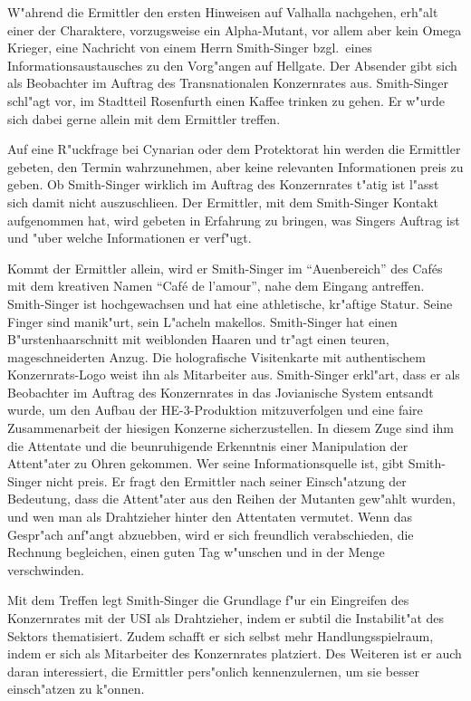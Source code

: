 
W"ahrend die Ermittler den ersten Hinweisen auf Valhalla nachgehen, erh"alt einer der Charaktere, vorzugsweise ein Alpha-Mutant, vor allem aber kein Omega Krieger, eine Nachricht von einem Herrn Smith-Singer bzgl.~eines Informationsaustausches zu den Vorg"angen auf Hellgate. Der Absender gibt sich als Beobachter im Auftrag des Transnationalen Konzernrates aus. Smith-Singer schl"agt vor, im Stadtteil Rosenfurth einen Kaffee trinken zu gehen. Er w"urde sich dabei gerne allein mit dem Ermittler treffen. 

Auf eine R"uckfrage bei Cynarian oder dem Protektorat hin werden die Ermittler gebeten, den Termin wahrzunehmen, aber keine relevanten Informationen preis zu geben. Ob Smith-Singer wirklich im Auftrag des Konzernrates t"atig ist l"asst sich damit nicht auszuschlie\3en. Der Ermittler, mit dem Smith-Singer Kontakt aufgenommen hat, wird gebeten in Erfahrung zu bringen, was Singers Auftrag ist und "uber welche Informationen er verf"ugt. 

Kommt der Ermittler allein, wird er Smith-Singer im "`Au\3enbereich"' des Caf\'es mit dem kreativen Namen "`Caf\'e de l'amour"', nahe dem Eingang antreffen. Smith-Singer ist hochgewachsen und hat eine athletische, kr"aftige Statur. Seine Finger sind manik"urt, sein L"acheln makellos. Smith-Singer hat einen B"urstenhaarschnitt mit wei\3blonden Haaren und tr"agt einen teuren, ma\3geschneiderten Anzug. Die holografische Visitenkarte mit authentischem Konzernrats-Logo weist ihn als Mitarbeiter aus. Smith-Singer erkl"art, dass er als Beobachter im Auftrag des Konzernrates in das Jovianische System entsandt wurde, um den Aufbau der HE-3-Produktion mitzuverfolgen und eine faire Zusammenarbeit der hiesigen Konzerne sicherzustellen. In diesem Zuge sind ihm die Attentate und die beunruhigende Erkenntnis einer Manipulation der Attent"ater zu Ohren gekommen. Wer seine Informationsquelle ist, gibt Smith-Singer nicht preis. Er fragt den Ermittler nach seiner Einsch"atzung der Bedeutung, dass die Attent"ater aus den Reihen der Mutanten gew"ahlt wurden, und wen man als Drahtzieher hinter den Attentaten vermutet. Wenn das Gespr"ach anf"angt abzuebben, wird er sich freundlich verabschieden, die Rechnung begleichen, einen guten Tag w"unschen und in der Menge verschwinden.

Mit dem Treffen legt Smith-Singer die Grundlage f"ur ein Eingreifen des Konzernrates mit der USI als Drahtzieher, indem er subtil die Instabilit"at des Sektors thematisiert. Zudem schafft er sich selbst mehr Handlungsspielraum, indem er sich als Mitarbeiter des Konzernrates platziert. Des Weiteren ist er auch daran interessiert, die Ermittler pers"onlich kennenzulernen, um sie besser einsch"atzen zu k"onnen.


